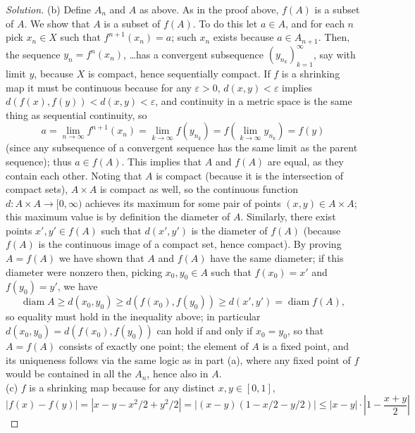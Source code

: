 \documentclass[10pt]{article}
\providecommand{\eps}{\varepsilon}
\newenvironment{soln}{\begin{proof}[Solution]}{\end{proof}}
\providecommand{\abs}[1]{\left|#1\right|}
\begin{document}
\begin{soln}
    (b) Define $A_n$ and $A$ as above.
    As in the proof above, $f(A)$ is a subset of $A$.
    We show that $A$ is a subset of $f(A)$. To do this let
    $a\in A$, and for each $n$ pick $x_n\in X$ such that
    $f^{n+1}(x_n) = a$; such $x_n$ exists because $a\in A_{n+1}$.
    Then, the sequence $y_n = f^n(x_n)$, \dots has a convergent subsequence
    $(y_{n_k})_{k=1}^\infty$, say with limit $y$,
    because $X$ is compact, hence sequentially compact.
    If $f$ is a shrinking map it must be continuous
    because for any $\eps>0$, $d(x,y) < \eps$ implies
    $d(f(x), f(y)) < d(x,y) < \eps$,
    and continuity in a metric space is the same thing as sequential continuity, so
    \begin{equation*}
	a = \lim_{n\to\infty} f^{n+1}(x_n) =
	\lim_{k\to\infty} f(y_{n_k}) = f(\lim_{k\to\infty}y_{n_k}) = f(y)
    \end{equation*}
    (since any subsequence of a convergent sequence
    has the same limit as the parent sequence); thus $a\in f(A)$.
    This implies that $A$ and $f(A)$ are equal, as they contain each other.
    Noting that $A$ is compact (because it is the intersection of compact sets),
    $A\times A$ is compact as well, so the continuous function
    $d\colon A\times A\to[0,\infty)$ achieves its maximum
    for some pair of points $(x,y)\in A\times A$; this maximum value is
    by definition the diameter of $A$. Similarly, there exist points
    $x',y'\in f(A)$ such that $d(x',y')$ is the diameter of $f(A)$
    (because $f(A)$ is the continuous image of a compact set, hence compact).
    By proving $A = f(A)$ we have shown that $A$ and $f(A)$ have the same diameter;
    if this diameter were nonzero then, picking $x_0,y_0\in A$ such that
    $f(x_0) = x'$ and $f(y_0) = y'$, we have
    \begin{equation*}
	\operatorname{diam}A \ge d(x_0,y_0) \ge d(f(x_0),f(y_0))
	\ge d(x',y') = \operatorname{diam}f(A),
    \end{equation*}
    so equality must hold in the inequality above;
    in particular $d(x_0,y_0) = d(f(x_0),f(y_0))$ can hold
    if and only if $x_0=y_0$, so that $A = f(A)$ consists of exactly one point;
    the element of $A$ is a fixed point, and its uniqueness follows
    via the same logic as in part (a),
    where any fixed point of $f$ would be contained in all the $A_n$,
    hence also in $A$.
    \\

    (c) $f$ is a shrinking map because for any distinct $x,y\in[0,1]$,
    \begin{equation*}
	\abs{f(x)-f(y)} = \abs{x - y - x^2/2 + y^2/2}
	= \abs{(x-y)(1 - x/2 - y/2)}
	\le \abs{x-y}\cdot\abs{1 - \frac{x+y}2}
    \end{equation*}


\end{soln}
\end{document}
